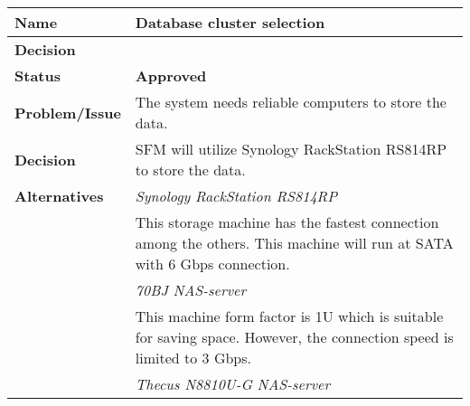 \begin{table}[H]
	\begin{tabular}{L{0.2\textwidth} L{0.6\textwidth}}
		\textbf{Name}           & \textbf{Database cluster selection} \\ \toprule
		\textbf{Decision}       & \textbf{} \\ \midrule
		\textbf{Status}         & \textbf{Approved} \\ \midrule
		\textbf{Problem/Issue}  & The system needs reliable computers to store the data. \\ \midrule
		\textbf{Decision}       & SFM will utilize Synology RackStation RS814RP to store the data.\\ \midrule
		\textbf{Alternatives}   & \textit{Synology RackStation RS814RP}\\
		& This storage machine has the fastest connection among the others. This machine will run at SATA with 6 Gbps connection.\\
		& \textit{70BJ NAS-server}\\
		& This machine form factor is 1U which is suitable for saving space. However, the connection speed is limited to 3 Gbps.\\
		& \textit{Thecus N8810U-G NAS-server} \\

\end{tabular}
\end{table}
